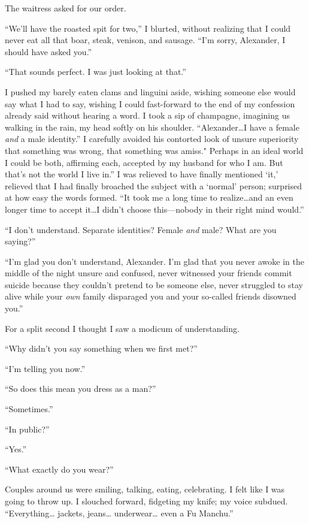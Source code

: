 The waitress asked for our order.

``We'll have the roasted spit for two,'' I blurted, without realizing
that I could never eat all that boar, steak, venison, and sausage. ``I'm
sorry, Alexander, I should have asked you.''

``That sounds perfect. I was just looking at that.''

I pushed my barely eaten clams and linguini aside, wishing someone else
would say what I had to say, wishing I could fast-forward to the end of
my confession already said without hearing a word. I took a sip of
champagne, imagining us walking in the rain, my head softly on his
shoulder. ``Alexander\ldots I have a female \emph{and} a male
identity.'' I carefully avoided his contorted look of unsure superiority
that something was wrong, that something was amiss." Perhaps in an ideal
world I could be both, affirming each, accepted by my husband for who I
am. But that's not the world I live in.'' I was relieved to have finally
mentioned `it,' relieved that I had finally broached the subject with a
`normal' person; surprised at how easy the words formed. ``It took me a
long time to realize\ldots and an even longer time to accept it\ldots I
didn't choose this---nobody in their right mind would.''

``I don't understand. Separate identities? Female \emph{and} male? What
are you saying?''

``I'm glad you don't understand, Alexander. I'm glad that you never
awoke in the middle of the night unsure and confused, never witnessed
your friends commit suicide because they couldn't pretend to be someone
else, never struggled to stay alive while your \emph{own} family
disparaged you and your so-called friends disowned you.''

For a split second I thought I saw a modicum of understanding.

``Why didn't you say something when we first met?''

``I'm telling you now.''

``So does this mean you dress as a man?''

``Sometimes.''

``In public?''

``Yes.''

``What exactly do you wear?''

Couples around us were smiling, talking, eating, celebrating. I felt
like I was going to throw up. I slouched forward, fidgeting my knife; my
voice subdued. ``Everything\ldots{} jackets, jeans\ldots{}
underwear\ldots{} even a Fu Manchu.''


